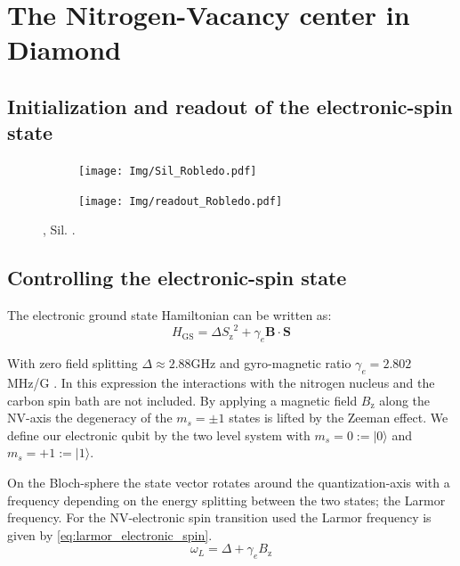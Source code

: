 \chapter{The Nitrogen-Vacancy center in Diamond}
\label{controlingspinsindiamond}



\section{Initialization and readout of the electronic-spin state}

\begin{figure}[htbp]
    \centering
    \begin{subfigure}[t]{0.49\textwidth}\centering
        \caption{}
        \label{fig:Sil_Robledo}
        \texttt{[image: Img/Sil\_Robledo.pdf]}
    \end{subfigure}
    \begin{subfigure}[t]{0.49\textwidth}\centering
       \caption{}
       \label{fig:readoutRobledo}
       \texttt{[image: Img/readout\_Robledo.pdf]}
   \end{subfigure}
   \caption{, Sil. . }
\end{figure}
\section{Controlling the electronic-spin state}
\label{spincontrol}

The electronic ground state Hamiltonian can be written as\citep{Bernien2014Control}:
 \begin{equation}
H_\mathrm{GS} = \Delta {S_\mathrm{z}}^2 + \gamma_e \mathbf{B} \cdot \mathbf{S}
\end{equation}

With zero field splitting $\Delta \approx 2.88 \mathrm{GHz}$  and gyro-magnetic ratio $\gamma_e  = 2.802$ MHz/G . In this expression the interactions with the nitrogen nucleus and the carbon spin bath are not included. By applying a magnetic field $B_\mathrm{z}$ along the NV-axis the degeneracy of the  $m_s =\pm1$ states is lifted by the Zeeman effect. We define our electronic qubit  by the two level system with  $m_s=0:=|0\rangle$ and $m_s = +1 := |1\rangle$.

On the Bloch-sphere the state vector rotates around the quantization-axis with a frequency depending on the energy splitting between the two states; the Larmor frequency.
For the NV-electronic spin transition used the Larmor frequency is given by \cref{eq:larmor_electronic_spin}.
\begin{equation}
    \omega_L =\Delta + \gamma_e {B_\mathrm{z}}
    \label{eq:larmor_electronic_spin}
\end{equation}

